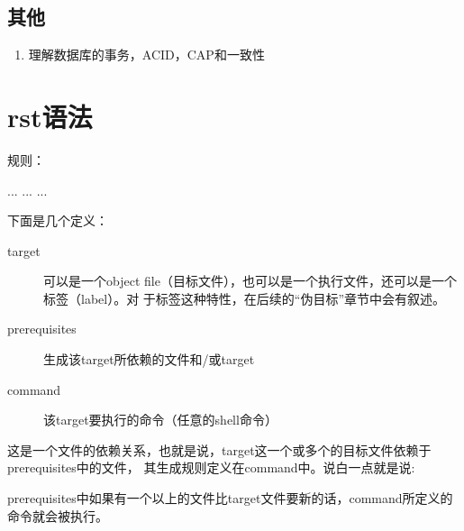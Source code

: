 \documentclass[letterpaper,10pt,english]{sphinxmanual}
\begin{document}
\subsection{其他}
\label{\detokenize{else/01_interview:id6}}\begin{enumerate}
\item {} 
理解数据库的事务，ACID，CAP和一致性

\end{enumerate}
\begin{quote}

\end{quote}


\section{rst语法}
\label{\detokenize{else/02_test_code:rst}}\label{\detokenize{else/02_test_code::doc}}
 规则：

%
\begin{sphinxVerbatim}[commandchars=\\\{\}]
  ...
    ...
    ...
\end{sphinxVerbatim}

下面是几个定义：
\begin{description}
\item[{target}] \leavevmode
可以是一个object file（目标文件），也可以是一个执行文件，还可以是一个标签（label）。对
于标签这种特性，在后续的“伪目标”章节中会有叙述。

\item[{prerequisites}] \leavevmode
生成该target所依赖的文件和/或target

\item[{command}] \leavevmode
该target要执行的命令（任意的shell命令）

\end{description}

这是一个文件的依赖关系，也就是说，target这一个或多个的目标文件依赖于prerequisites中的文件，
其生成规则定义在command中。说白一点就是说:

%
\begin{sphinxVerbatim}[commandchars=\\\{\}]
prerequisites中如果有一个以上的文件比target文件要新的话，command所定义的命令就会被执行。
\end{sphinxVerbatim}
\end{document}
